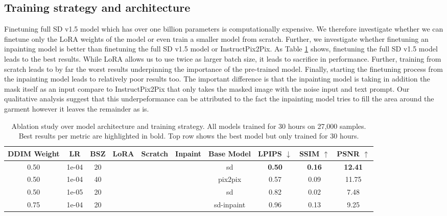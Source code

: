 \documentclass[11pt,twocolumn]{article}
\newcommand{\cmark}{\checkmark}
\newcommand{\xmark}{\ding{55}}
\begin{document}
\subsection{Training strategy and architecture}
Finetuning full SD v1.5 model which has over one billion parameters is computationally expensive. We therefore investigate
whether we can finetune only the LoRA weights of the model or even train a smaller model from scratch. Further, we investigate
whether finetuning an inpainting model is better than finetuning the full SD v1.5 model or InstructPix2Pix. 
As Table \ref{tab:arch-ablation} shows, finetuning the full SD v1.5 model leads to the best results. While LoRA \cite{lora} 
allows us to use twice as larger batch size, it leads to sacrifice in performance. Further, training from scratch leads to 
by far the worst results underpinning the importance of the pre-trained model. Finally, starting the 
finetuning process from the inpainting model leads to relatively poor results too. The important 
difference is that the inpainting model is taking in addition the mask itself as an input compare to InstructPix2Pix
that only takes the masked image with the noise input and text prompt. Our qualitative analysis 
suggest that this underpeformance can be attributed to the fact the inpainting model 
tries to fill the area around the garment however it leaves the remainder as is.






\begin{table}[t]
  \centering
    \begin{tabular}{ccccccc|ccc}
    \toprule
    \textbf{DDIM Weight} & \textbf{LR} & \textbf{BSZ} & \textbf{LoRA} & \textbf{Scratch} & \textbf{Inpaint} & \textbf{Base Model} & \textbf{LPIPS} $\downarrow$ & \textbf{SSIM} $\uparrow$ & \textbf{PSNR} $\uparrow$ \\
    \midrule
    0.50 & 1e-04 & 20 & \xmark & \xmark & \xmark & sd & \textbf{0.50} & \textbf{0.16} & \textbf{12.41} \\
    \midrule
    0.50 & 1e-04 & 40 & \cmark & \xmark & \xmark & pix2pix & 0.57 & 0.09 & 11.75 \\
    0.50 & 1e-05 & 20 & \xmark & \cmark & \xmark & sd & 0.82 & 0.02 & 7.48 \\
    \midrule
    0.75 & 1e-04 & 20 & \cmark & \xmark & \cmark & sd-inpaint & 0.96 & 0.13 & 9.25 \\

    \bottomrule
    \end{tabular}
    \caption{Ablation study over model architecture and training strategy. All models trained for 30 hours on 27,000 samples. Best results per 
    metric are highlighted in bold. Top row shows the best model but only trained for 30 hours.}
    \label{tab:arch-ablation}
\end{table}




\newpage


\end{document}

